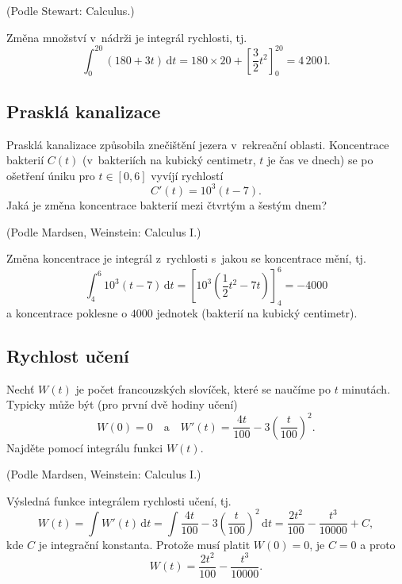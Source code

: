 (Podle Stewart: Calculus.)

\reseni
Změna množství v nádrži je integrál rychlosti, tj. 
\begin{equation*}
  \int_0^{20} (180+3t)\,\mathrm dt=180\times 20 + \left[\frac 32 t^2\right]_0^{20}=4\, 200 \,\mathrm l.
\end{equation*}
\konec


\subsection{Prasklá kanalizace} Prasklá kanalizace způsobila znečištění jezera v rekreační
oblasti. Koncentrace bakterií $C(t)$ (v bakteriích na kubický
centimetr, $t$ je čas ve dnech) se po ošetření úniku pro $t\in[0,6]$  vyvíjí
rychlostí $$C'(t)=10^3(t-7).$$ Jaká je změna koncentrace bakterií mezi
čtvrtým a šestým dnem?

(Podle Mardsen, Weinstein: Calculus I.)

\reseni
Změna koncentrace je integrál z rychlosti s jakou se koncentrace mění, tj. 
\begin{equation*}
  \int_4^6 10^3(t-7)\,\mathrm dt= \left[10^3\left (\frac 12 t^2-7t\right)\right]_4^6=-4000
\end{equation*}
a koncentrace poklesne o $4000$ jednotek (bakterií na kubický centimetr).
\konec

\stranka


\subsection{Rychlost učení} Nechť $W(t)$ je počet francouzských slovíček,
které se naučíme po $t$ minutách. Typicky může být (pro první dvě hodiny učení)
$$W(0)=0\quad \text {a} \quad W'(t)=\frac{4t}{100}-3\left (\frac  t{100}\right)^2.$$ Najděte pomocí integrálu funkci $W(t)$.

(Podle Mardsen, Weinstein: Calculus I.)

\reseni Výsledná funkce integrálem rychlosti učení, tj.
\begin{equation*}
W(t)=\int W'(t) \,\mathrm dt  =  \int \frac{4t}{100}-3\left (\frac  t{100}\right)^2 \,\mathrm dt  =\frac {2t^2}{100}-\frac{t^3}{10000} +C,
\end{equation*}
kde $C$ je integrační konstanta. Protože musí platit $W(0)=0$, je $C=0$ a proto
\begin{equation*}
  W(t)=\frac {2t^2}{100}-\frac{t^3}{10000}.
\end{equation*}

